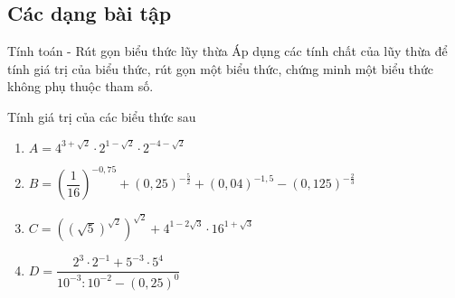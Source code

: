 \subsection{Các dạng bài tập}
\begin{dang}{Tính toán - Rút gọn biểu thức lũy thừa}
	Áp dụng các tính chất của lũy thừa để tính giá trị của biểu thức, rút gọn một biểu thức, chứng minh một biểu thức không phụ thuộc tham số.
\end{dang}

\begin{vd}%
	Tính giá trị của các biểu thức sau
	\begin{enumerate}
		\item $A=4^{3+\sqrt2}\cdot 2^{1-\sqrt2}\cdot 2^{-4-\sqrt2}$
		\item $B=\left(\dfrac{1}{16}\right)^{-0{,}75}+(0{,}25)^{-\frac{5}{2}}+(0{,}04)^{-1{,}5}-(0{,}125)^{-\frac{2}{3}}$
		\item $C=\left( \left(\sqrt5\right)^{\sqrt2} \right)^{\sqrt2}+4^{1-2\sqrt3}\cdot 16^{1+\sqrt3}$
		\item $D=\dfrac{2^3\cdot 2^{-1}+5^{-3}\cdot 5^4}{10^{-3}:10^{-2}-(0{,}25)^0}$
	\end{enumerate}
\end{vd}

